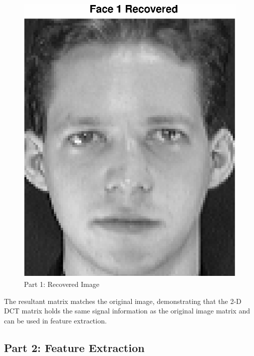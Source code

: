\documentclass[conference]{IEEEtran}
\begin{document}
  \begin{figure}[H]
    \centering
    \includegraphics[scale=0.5]{./img/part_1_recovery}
    \caption{Part 1: Recovered Image}
    \label{fig:part_1_recovery}
  \end{figure}

  The resultant matrix matches the original image, demonstrating that the 2-D
  DCT matrix holds the same signal information as the original image matrix and
  can be used in feature extraction.

\subsection{Part 2: Feature Extraction}
\end{document}
